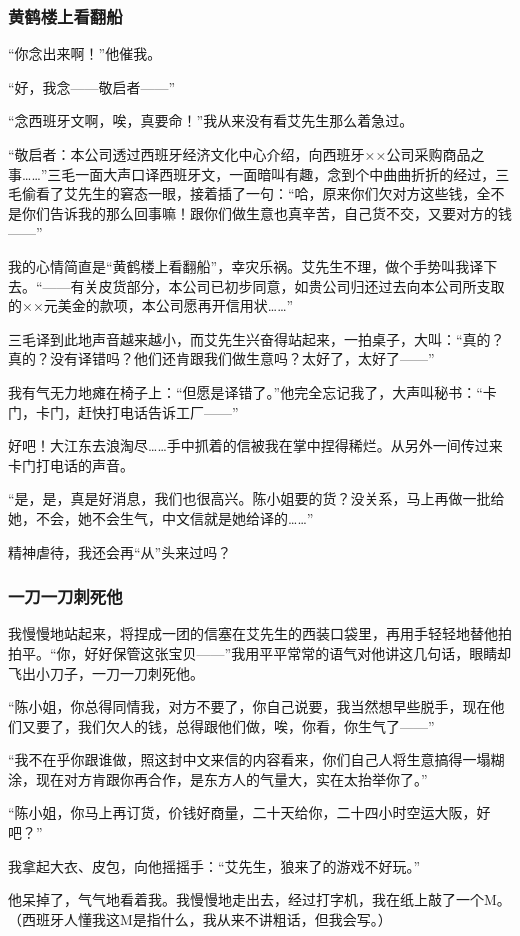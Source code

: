 \subsubsection*{黄鹤楼上看翻船}
\par “你念出来啊！”他催我。
\par “好，我念——敬启者——”
\par “念西班牙文啊，唉，真要命！”我从来没有看艾先生那么着急过。
\par “敬启者：本公司透过西班牙经济文化中心介绍，向西班牙××公司采购商品之事……”三毛一面大声口译西班牙文，一面暗叫有趣，念到个中曲曲折折的经过，三毛偷看了艾先生的窘态一眼，接着插了一句：“哈，原来你们欠对方这些钱，全不是你们告诉我的那么回事嘛！跟你们做生意也真辛苦，自己货不交，又要对方的钱——”
\par 我的心情简直是“黄鹤楼上看翻船”，幸灾乐祸。艾先生不理，做个手势叫我译下去。“——有关皮货部分，本公司已初步同意，如贵公司归还过去向本公司所支取的××元美金的款项，本公司愿再开信用状……”
\par 三毛译到此地声音越来越小，而艾先生兴奋得站起来，一拍桌子，大叫：“真的？真的？没有译错吗？他们还肯跟我们做生意吗？太好了，太好了——”
\par 我有气无力地瘫在椅子上：“但愿是译错了。”他完全忘记我了，大声叫秘书：“卡门，卡门，赶快打电话告诉工厂——”
\par 好吧！大江东去浪淘尽……手中抓着的信被我在掌中捏得稀烂。从另外一间传过来卡门打电话的声音。
\par “是，是，真是好消息，我们也很高兴。陈小姐要的货？没关系，马上再做一批给她，不会，她不会生气，中文信就是她给译的……”
\par 精神虐待，我还会再“从”头来过吗？
\subsubsection*{一刀一刀刺死他}
\par 我慢慢地站起来，将捏成一团的信塞在艾先生的西装口袋里，再用手轻轻地替他拍拍平。“你，好好保管这张宝贝——”我用平平常常的语气对他讲这几句话，眼睛却飞出小刀子，一刀一刀刺死他。
\par “陈小姐，你总得同情我，对方不要了，你自己说要，我当然想早些脱手，现在他们又要了，我们欠人的钱，总得跟他们做，唉，你看，你生气了——”
\par “我不在乎你跟谁做，照这封中文来信的内容看来，你们自己人将生意搞得一塌糊涂，现在对方肯跟你再合作，是东方人的气量大，实在太抬举你了。”
\par “陈小姐，你马上再订货，价钱好商量，二十天给你，二十四小时空运大阪，好吧？”
\par 我拿起大衣、皮包，向他摇摇手：“艾先生，狼来了的游戏不好玩。”
\par 他呆掉了，气气地看着我。我慢慢地走出去，经过打字机，我在纸上敲了一个M。（西班牙人懂我这M是指什么，我从来不讲粗话，但我会写。）
